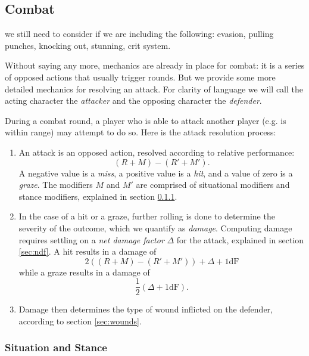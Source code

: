 \documentclass[12pt]{article}
\newcommand{\notes}[1]{{\color{Tan} #1}}
\begin{document}
\subsection{Combat}\label{sec:qombat}

\notes{we still need to consider if we are including the following:
evasion,
pulling punches, knocking out, stunning,
crit system.
}

\def\NDF{\Delta}
\def\ODF{d}
\def\ODFA{d_A}
\def\ODFM{d_M}
\def\DDF{\ODF'}
\def\DDFA{\ODFA'}
\def\DDFM{\ODFM'}


Without saying any more, mechanics are already in place for combat:
it is a series of opposed actions that usually trigger rounds.
But we provide some more detailed mechanics for resolving an attack. %
For clarity of language we will call the acting character the \emph{attacker}
and the opposing character the \emph{defender}.

During a combat round, a player who is able to attack another player (e.g. is within range) may attempt to do so.
Here is the attack resolution process:
\vspace{-1em}\begin{enumerate}
\item
An attack is an opposed action, resolved according to relative performance:
$$ (R + M) - (R' + M'). $$
A negative value is a \emph{miss}, a positive value is a \emph{hit}, and a value of zero is a \emph{graze}.
The modifiers $M$ and $M'$ are comprised of situational modifiers and stance modifiers, explained in section \ref{sec:sitmod}.
\item
In the case of a hit or a graze, further rolling is done to determine the severity of the outcome,
which we quantify as \emph{damage}.
Computing damage requires settling on a \emph{net damage factor} $\NDF$ for the attack, explained in section \ref{sec:ndf}.
A hit results in a damage of
$$ 2((R + M) - (R' + M')) + \NDF + 1\text{dF} $$
while a graze results in a damage of
$$ \frac{1}{2} (\NDF + 1\text{dF}). $$
\item
Damage then determines the type of wound inflicted on the defender, according to section \ref{sec:wounds}.
\end{enumerate}



\subsubsection{Situation and Stance}\label{sec:sitmod}
\end{document}
